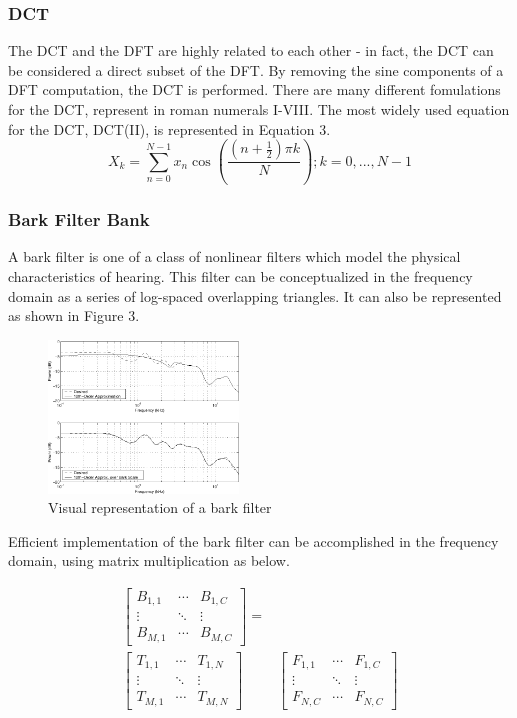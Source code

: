 \documentclass[journal]{IEEEtran}
\begin{document}
\subsubsection{DCT}
The DCT and the DFT are highly related to each other - in fact, the DCT can be considered a direct subset of the DFT. By removing the sine components
of a DFT computation, the DCT is performed. There are many different fomulations for the DCT, represent in roman numerals I-VIII. The most widely
used equation for the DCT, DCT(II), is represented in Equation 3. \cite{DSPBook}
\begin{equation}
X_k = \sum_{n=0}^{N-1}x_n\cos(\frac{(n + \frac{1}{2})\pi k}{N});k = 0,...,N-1
\end{equation}

\subsubsection{Bark Filter Bank}
A bark filter is one of a class of nonlinear filters which model the physical characteristics of hearing. This filter can be conceptualized in 
the frequency domain as a series of log-spaced overlapping triangles. It can also be represented as shown in Figure 3.

\begin{figure}[h!]
\centering
  \includegraphics[width=0.45\textwidth]{fig3.png}
\caption{Visual representation of a bark filter \cite{AudioBook}}
\end{figure}

Efficient implementation of the bark filter can be accomplished in the frequency domain, using matrix multiplication as below.
\begin{small}
\begin{align}
\begin{bmatrix}
B_{1,1} & \cdots & B_{1,C} \\
\vdots & \ddots & \vdots \\
B_{M,1} & \cdots & B_{M,C} 
\end{bmatrix} = \nonumber \\ 
\begin{bmatrix}
T_{1,1} & \cdots & T_{1,N} \\
\vdots & \ddots & \vdots \\
T_{M,1} & \cdots & T_{M,N}
\end{bmatrix} & 
\begin{bmatrix}
F_{1,1} & \cdots & F_{1,C} \\
\vdots & \ddots & \vdots \\
F_{N,C} & \cdots & F_{N,C}
\end{bmatrix} 
\end{align}
\end{small}
\end{document}

